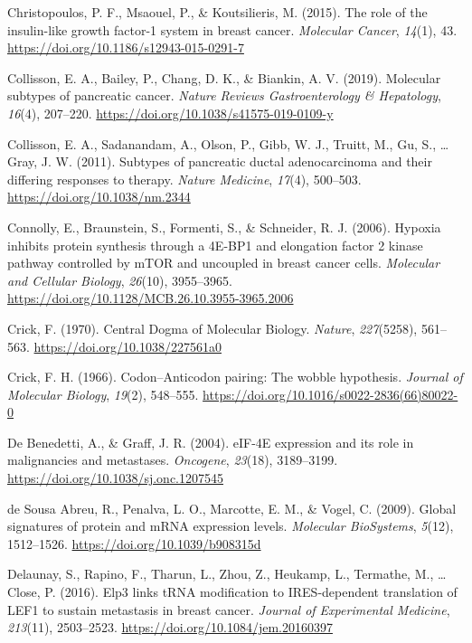 \documentclass[12pt,openany]{book}
\begin{document}
\hypertarget{ref-Christopoulos2015}{}
Christopoulos, P. F., Msaouel, P., \& Koutsilieris, M. (2015). The role
of the insulin-like growth factor-1 system in breast cancer.
\emph{Molecular Cancer}, \emph{14}(1), 43.
\url{https://doi.org/10.1186/s12943-015-0291-7}

\hypertarget{ref-Collisson2019}{}
Collisson, E. A., Bailey, P., Chang, D. K., \& Biankin, A. V. (2019).
Molecular subtypes of pancreatic cancer. \emph{Nature Reviews
Gastroenterology \& Hepatology}, \emph{16}(4), 207--220.
\url{https://doi.org/10.1038/s41575-019-0109-y}

\hypertarget{ref-Collisson2011}{}
Collisson, E. A., Sadanandam, A., Olson, P., Gibb, W. J., Truitt, M.,
Gu, S., \ldots{} Gray, J. W. (2011). Subtypes of pancreatic ductal
adenocarcinoma and their differing responses to therapy. \emph{Nature
Medicine}, \emph{17}(4), 500--503. \url{https://doi.org/10.1038/nm.2344}

\hypertarget{ref-Connolly2006}{}
Connolly, E., Braunstein, S., Formenti, S., \& Schneider, R. J. (2006).
Hypoxia inhibits protein synthesis through a 4E-BP1 and elongation
factor 2 kinase pathway controlled by mTOR and uncoupled in breast
cancer cells. \emph{Molecular and Cellular Biology}, \emph{26}(10),
3955--3965. \url{https://doi.org/10.1128/MCB.26.10.3955-3965.2006}

\hypertarget{ref-Crick1970}{}
Crick, F. (1970). Central Dogma of Molecular Biology. \emph{Nature},
\emph{227}(5258), 561--563. \url{https://doi.org/10.1038/227561a0}

\hypertarget{ref-Crick1966}{}
Crick, F. H. (1966). Codon--Anticodon pairing: The wobble hypothesis.
\emph{Journal of Molecular Biology}, \emph{19}(2), 548--555.
\url{https://doi.org/10.1016/s0022-2836(66)80022-0}

\hypertarget{ref-DeBenedetti2004}{}
De Benedetti, A., \& Graff, J. R. (2004). eIF-4E expression and its role
in malignancies and metastases. \emph{Oncogene}, \emph{23}(18),
3189--3199. \url{https://doi.org/10.1038/sj.onc.1207545}

\hypertarget{ref-deSousaAbreu2009}{}
de Sousa Abreu, R., Penalva, L. O., Marcotte, E. M., \& Vogel, C.
(2009). Global signatures of protein and mRNA expression levels.
\emph{Molecular BioSystems}, \emph{5}(12), 1512--1526.
\url{https://doi.org/10.1039/b908315d}

\hypertarget{ref-Delaunay2016}{}
Delaunay, S., Rapino, F., Tharun, L., Zhou, Z., Heukamp, L., Termathe,
M., \ldots{} Close, P. (2016). Elp3 links tRNA modification to
IRES-dependent translation of LEF1 to sustain metastasis in breast
cancer. \emph{Journal of Experimental Medicine}, \emph{213}(11),
2503--2523. \url{https://doi.org/10.1084/jem.20160397}
\end{document}
